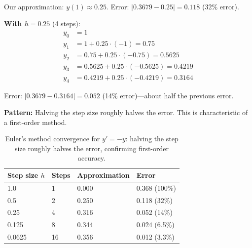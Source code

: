 Our approximation: $y(1) \approx 0.25$. Error: $|0.3679 - 0.25| = 0.118$ (32\% error).


\vspace{1em}
\textbf{With $h = 0.25$} (4 steps):
\begin{align*}
    y_0 &= 1 \\
    y_1 &= 1 + 0.25 \cdot (-1) = 0.75 \\
    y_2 &= 0.75 + 0.25 \cdot (-0.75) = 0.5625 \\
    y_3 &= 0.5625 + 0.25 \cdot (-0.5625) = 0.4219 \\
    y_4 &= 0.4219 + 0.25 \cdot (-0.4219) = 0.3164
\end{align*}


Error: $|0.3679 - 0.3164| = 0.052$ (14\% error)---about half the previous error.

\vspace{1em}
\textbf{Pattern:} Halving the step size roughly halves the error. This is characteristic of a first-order method.

\begin{table}[ht]
\centering
\begin{tabular}{p{}p{}p{}p{}}
\toprule
\textbf{Step size} $h$ & \textbf{Steps} & \textbf{Approximation} & \textbf{Error} \\
\midrule
1.0 & 1 & 0.000 & 0.368 (100\%) \\
0.5 & 2 & 0.250 & 0.118 (32\%) \\
0.25 & 4 & 0.316 & 0.052 (14\%) \\
0.125 & 8 & 0.344 & 0.024 (6.5\%) \\
0.0625 & 16 & 0.356 & 0.012 (3.3\%) \\
\bottomrule
\end{tabular}
\vspace{2em}
\caption{Euler's method convergence for $y' = -y$: halving the step size roughly halves the error, confirming first-order accuracy.}
\label{tab:euler_convergence}
\end{table}


